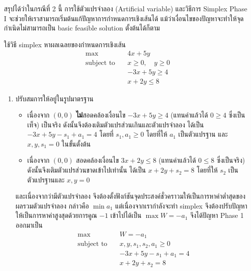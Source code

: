 \noindent
สรุปได้ว่าในกรณีที่ 2 นี้ การใช้ตัวแปรจำลอง (Artificial variable) และวิธีการ Simplex Phase I จะช่วยให้เราสามารถเริ่มต้นแก้ปัญหาการกำหนดการเชิงเส้นได้ แม้ว่าเงื่อนไขของปัญหาจะทำให้จุดกำเนิดไม่สามารถเป็น basic feasible solution ตั้งต้นได้ก็ตาม

\begin{example}
    {}{}
    ใช้วิธี simplex หาผลเฉลยของกำหนดการเชิงเส้น
    \begin{align*}
        \max \quad & 4x + 5y \\
        \text{subject to} \quad
        & x \geq 0, \quad y \geq 0 \\
        & -3x + 5y \geq 4\\
        & x + 2y \leq 8
    \end{align*}
\end{example}
\begin{solution}
    \begin{enumerate}[label=\textbf{ขั้นที่ \arabic*:}, align=left, labelwidth=5em, labelsep=1em, leftmargin=*, itemsep=16pt, topsep=0pt, parsep=0pt, partopsep=0pt]
    \item ปรับสมการให้อยู่ในรูปมาตรฐาน
        \begin{itemize}
            \item เนื่องจาก $(0,0)$ \textbf{ไม่}สอดคล้องเงื่อนไข $-3x + 5y \geq 4$ (แทนค่าแล้วได้ $0\geq 4$ ซึ่งเป็นเท็จ) เป็นจริง ดังนั้นจึงต้องเติมตัวแปรส่วนเกินและตัวแปรจำลอง ได้เป็น $-3x + 5y - s_1 + a_1 = 4$ โดยที่ $s_1, a_1 \geq 0$ โดยที่ให้ $a_1$ เป็นตัวแปรฐาน และ $x,y,s_1 = 0$ ในขั้นตั้งต้น
            \item เนื่องจาก $(0,0)$ สอดคล้องเงื่อนไข $3x + 2y \leq 8$ (แทนค่าแล้วได้ $0 \leq 8$ ซึ่งเป็นจริง) ดังนั้นจึงเติมตัวแปรส่วนขาดเข้าไปเท่านั้น ได้เป็น $x + 2y + s_2 = 8$ โดยที่ให้ $s_2$ เป็นตัวแปรฐานและ $x,y=0$
        \end{itemize}
        และเนื่องจากว่ามีตัวแปรจำลอง จึงต้องตั้งฟังก์ชันจุดประสงค์ชั่วคราวมให้เป็นการหาค่าต่ำสุดของผลรวมตัวแปรจำลอง กล่าวคือ $\min a_1$ แต่เนื่องจากเรากำลังจะทำ simplex จึงต้องปรับปัญหาให้เป็นการหาค่าสูงสุดด้วยการคูณ $-1$ เข้าไปได้เป็น $\max W = -a_1$ จึงได้ปัญหา Phase 1 ออกมาเป็น
        \begin{align*}
            \max \quad & W = -a_1 \\
            \text{subject to} \quad
            & x, y, s_1, s_2, a_1 \geq 0 \\
            & -3x + 5y -s_1 + a_1 = 4\\
            & x + 2y + s_2 = 8
        \end{align*}


\end{enumerate}
\end{solution}
